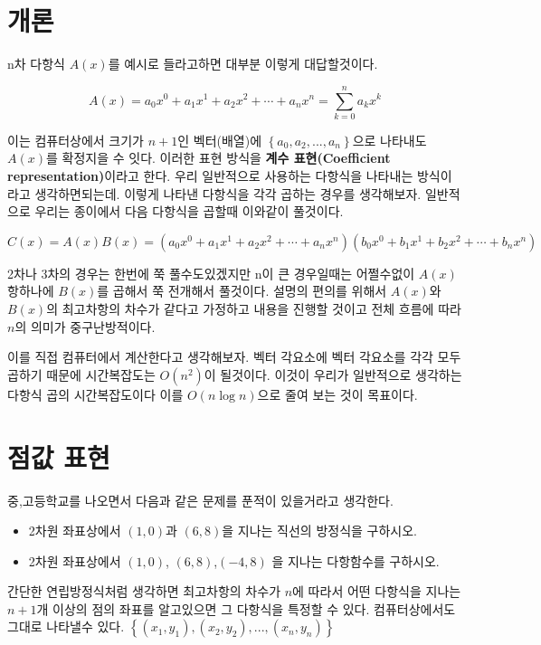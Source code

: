 
\section{개론}

n차 다항식 $A(x)$를 예시로 들라고하면 대부분 이렇게 대답할것이다.

$$A(x) = a_0x^0 + a_1x^1 + a_2x^2 + \cdots + a_{n}x^n = \sum_{k=0}^{n} a_kx^k$$

이는 컴퓨터상에서 크기가 $n+1$인 벡터(배열)에 $\left\{a_0,a_2, ... , a_n \right\}$으로 나타내도 $A(x)$를 확정지을 수 잇다. 이러한 표현 방식을 \textbf{계수 표현(Coefficient representation)}이라고 한다.
우리 일반적으로 사용하는 다항식을 나타내는 방식이라고 생각하면되는데. 
이렇게 나타낸 다항식을 각각 곱하는 경우를 생각해보자.
일반적으로 우리는 종이에서 다음 다항식을 곱할때 이와같이 풀것이다.

$$C(x) = A(x)B(x) = (a_0x^0 + a_1x^1 + a_2x^2 + \cdots + a_nx^n)(b_0x^0 + b_1x^1 + b_2x^2 + \cdots + b_nx^n)$$

2차나 3차의 경우는 한번에 쭉 풀수도있겠지만
n이 큰 경우일때는 어쩔수없이 $A(x)$ 항하나에 $B(x)$를 곱해서 쭉 전개해서 풀것이다. 설명의 편의를 위해서 $A(x)$와 $B(x)$의 최고차항의 차수가 같다고 가정하고 내용을 진행할 것이고 전체 흐름에 따라 $n$의 의미가 중구난방적이다.

이를 직접 컴퓨터에서 계산한다고 생각해보자.
벡터 각요소에 벡터 각요소를 각각 모두 곱하기 때문에 시간복잡도는 $O(n^2)$이 될것이다. 이것이 우리가 일반적으로 생각하는 다항식 곱의 시간복잡도이다
이를 $O(n \log n)$으로 줄여 보는 것이 목표이다.

\section{점값 표현}

중,고등학교를 나오면서 다음과 같은 문제를 푼적이 있을거라고 생각한다.

\begin{framed}
    \begin{itemize}
        \item 2차원 좌표상에서 $(1,0)$과 $(6,8)$을 지나는 직선의 방정식을 구하시오.
        \item 2차원 좌표상에서 $(1,0)$, $(6,8)$,$(-4,8)$ 을 지나는 다항함수를 구하시오.
    \end{itemize}
\end{framed}

간단한 연립방정식처럼 생각하면 최고차항의 차수가 $n$에 따라서 어떤 다항식을 지나는 $n+1$개 이상의 점의 좌표를 알고있으면 그 다항식을 특정할 수 있다.
컴퓨터상에서도 그대로 나타낼수 있다.
$\left\{(x_1, y_1),(x_2, y_2), ... ,(x_n, y_n)\right\}$

